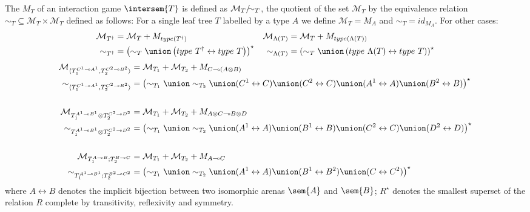 \begin{definition}
The  $M_T$ of an interaction game
$\intersem{T}$ is defined as $\mathcal{M}_T/\hspace{-0.5em}\sim_T$,
the quotient of the set $\mathcal{M}_T$ by the equivalence relation
$\sim_T \subseteq \mathcal{M}_T \times \mathcal{M}_T$ defined as follows:
For a single leaf tree $T$ labelled by a type $A$ we define
$\mathcal{M}_T = M_A$ and $\sim_T = id_{M_A}$. For other cases:
    \begin{align*}
        \mathcal{M}_{T^\dagger} &= \mathcal{M}_{T} + M_{type(T^\dagger)}
    &
        \mathcal{M}_{\Lambda(T)} &= \mathcal{M}_{T} + M_{type(\Lambda(T))}
    \\
        \sim_{T^\dagger} &= \left( \sim_{T}
        \union \left(type\ T^\dagger \leftrightarrow  type\ T\right)
        \right)^\star
    &
        \sim_{\Lambda(T)} &= \left( \sim_{T}
        \union \left(type\ \Lambda(T) \leftrightarrow type\ T\right)
        \right)^\star
    \end{align*}
    \begin{align*}
        \mathcal{M}_{\langle T_1^{C^1 \multimap A^1}, T_2^{C^2 \multimap B^2}\rangle}
        &= \mathcal{M}_{T_1} + \mathcal{M}_{T_2} + M_{C \multimap (A \otimes B)}
    \\
         \sim_{\langle T_1^{C^1 \multimap A^1}, T_2^{C^2 \multimap B^2}\rangle} &= \left( \sim_{T_1}
        \union \sim_{T_2} \union (C^1 \leftrightarrow C) \union (C^2 \leftrightarrow C)
        \union (A^1 \leftrightarrow A) \union (B^2 \leftrightarrow B)
        \right)^\star
    \\
    \\
        \mathcal{M}_{T_1^{A^1 \multimap B^1}\otimes T_2^{C^2 \multimap D^2}} &= \mathcal{M}_{T_1} +  \mathcal{M}_{T_2} + M_{A \otimes C \multimap B \otimes D }
        \\
         \sim_{T_1^{A^1 \multimap B^1}\otimes T_2^{C^2 \multimap D^2}} &= \left( \sim_{T_1}
        \union \sim_{T_2} \union (A^1 \leftrightarrow A)
        \union (B^1 \leftrightarrow B) \union (C^2 \leftrightarrow C)\union (D^2 \leftrightarrow D)
        \right)^\star
    \\
    \\
        \mathcal{M}_{T_1^{A \multimap B};T_2^{B \multimap C}} &=
            \mathcal{M}_{T_1} + \mathcal{M}_{T_2} + M_{A\multimap C}
        \\
         \sim_{T_1^{A^1 \multimap B^1};T_2^{B^2 \multimap C^2}} &= \left( \sim_{T_1}
        \union \sim_{T_2} \union (A^1 \leftrightarrow A)
        \union (B^1 \leftrightarrow B^2) \union (C \leftrightarrow C^2)
        \right)^\star
    \end{align*}
    where $A\leftrightarrow B$ denotes the implicit bijection between
    two isomorphic arenas $\sem{A}$ and $\sem{B}$; $R^\star$
    denotes the smallest superset of the relation $R$ complete
    by transitivity, reflexivity and symmetry.
\end{definition}

